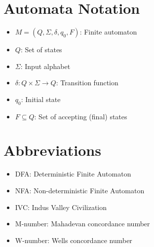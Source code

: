 \section*{Automata Notation}

\begin{itemize}
    \item $M = (Q, \Sigma, \delta, q_0, F)$: Finite automaton
    \item $Q$: Set of states
    \item $\Sigma$: Input alphabet
    \item $\delta: Q \times \Sigma \rightarrow Q$: Transition function
    \item $q_0$: Initial state
    \item $F \subseteq Q$: Set of accepting (final) states
\end{itemize}

\section*{Abbreviations}

\begin{itemize}
    \item DFA: Deterministic Finite Automaton
    \item NFA: Non-deterministic Finite Automaton
    \item IVC: Indus Valley Civilization
    \item M-number: Mahadevan concordance number
    \item W-number: Wells concordance number
\end{itemize}
